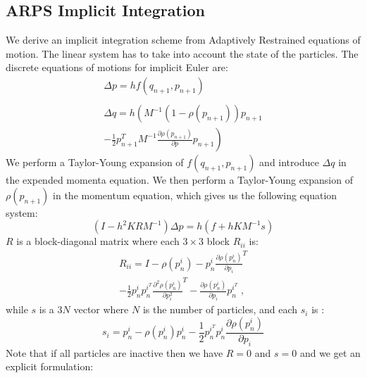 \subsection{ ARPS Implicit Integration }
We derive an implicit integration scheme from Adaptively Restrained equations of motion.
The linear system has to take into account the state of the particles.
The discrete equations of motions for implicit Euler are:
\begin{equation}
	\label{eq:implicitEqMotion}
	\begin{array}{l}
	\displaystyle \Delta p =  h f(q_{n+1}, p_{n+1})\\
				\\
	\displaystyle \Delta q = h \left( M^{-1}(1-\rho(p_{n+1}))p_{n+1} \right. \\
	\displaystyle \left. - \frac{1}{2	}p_{n+1}^{T} M^{-1} \frac{\partial \rho(p_{n+1})}{\partial p}p_{n+1} \right)
	\end{array}
\end{equation}
We perform a Taylor-Young expansion of $f(q_{n+1}, p_{n+1})$ and introduce $\Delta q$ in the expended momenta equation.
We then perform a Taylor-Young expansion of $\rho(p_{n+1})$ in the momentum equation, which gives us the following equation system:
\begin{equation}
	\label{eq:arpsLinearSystem}
	( I -h^{2}KRM^{-1} ) \Delta p = h( f + h KM^{-1}s )
\end{equation}
$R$ is a block-diagonal matrix where each $3\times 3$ block $R_{ii}$ is:
\begin{equation}
	\label{eq:Ri}
	\begin{array}{l}
	\displaystyle R_{ii} = I - \rho(p^{i}_{n}) - p^{i}_{n} \frac{\partial \rho(p^{i}_{n})}{\partial p_{i}}^{T} \\
	\displaystyle - \frac{1}{2}p^{i}_{n}p^{i^{T}}_{n}\frac{\partial^{2} \rho(p^{i}_{n})}{\partial p_{i}^{2}}^{T} -
	\displaystyle \frac{\partial \rho(p^{i}_{n})}{\partial p_{i}} p^{i^{T}}_{n} \;,
	\end{array}
\end{equation}
while $s$ is a $3N$ vector where $N$ is the number of particles, and each $s_{i}$ is :
\begin{equation}
	\label{eq:si}
	\displaystyle s_{i} = p^{i}_{n} - \rho(p^{i}_{n})p^{i}_{n} - \frac{1}{2	}p^{i^{T}}_{n}p^{i}_{n}\frac{\partial \rho(p^{i}_{n})}{\partial p_{i}}
\end{equation}
Note that if all particles are inactive then we have $R = 0$ and $s = 0$ and we get an explicit formulation:
